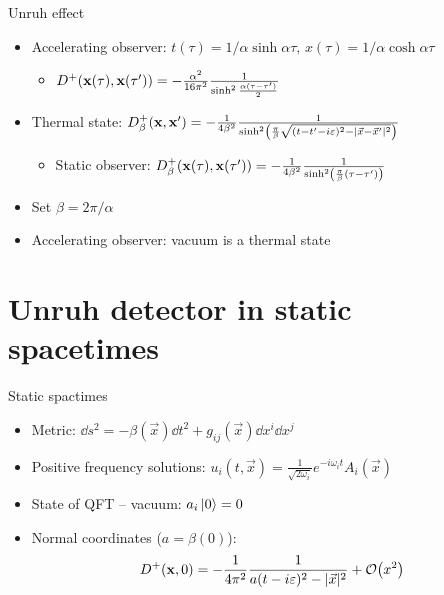 \documentclass{beamer}
\renewcommand{\va}[1]{\vec{#1}}
\begin{document}
\begin{frame}{Unruh effect}
\begin{itemize}
	\item Accelerating observer: \(t(\tau) = 1/\alpha \sinh \alpha\tau,\,x(\tau) = 1/\alpha \cosh \alpha\tau\)
	\begin{itemize}
		\item \(D^+(\vb{x}(\tau), \vb{x}(\tau')) = -\frac{\alpha^2}{16\pi^2} \frac{1}{\sinh^2\frac{\alpha(\tau-\tau')}{2}}\)
	\end{itemize}
	\item Thermal state: \(D^+_\beta(\vb{x},\vb{x}') = -\frac{1}{4\beta^2} \frac{1}{\sinh[2](\frac{\pi}{\beta}\sqrt{(t-t'-i\varepsilon)^2 - |\va{x}-\va{x}'|^2})}\)
	\begin{itemize}
		\item Static observer: \(D^+_\beta(\vb{x}(\tau),\vb{x}(\tau')) = -\frac{1}{4\beta^2} \frac{1}{\sinh[2](\frac{\pi}{\beta} (\tau-\tau'))}\)
	\end{itemize}
	\item Set \(\beta = 2\pi/\alpha\)
	\item Accelerating observer: vacuum is a thermal state
\end{itemize}
\end{frame}

\section{Unruh detector in static spacetimes}
\begin{frame}{Static spactimes}
\begin{itemize}
	\item Metric: \(\dd{s^2} = -\beta(\va{x}) \dd{t^2} + g_{ij}(\va{x}) \dd{x^i} \dd{x^j}\)
	\item Positive frequency solutions: \(u_{i}(t, \va{x}) = \frac{1}{\sqrt{2\omega_i}}e^{-i\omega_i t} A_i(\va{x})\)
	\item State of QFT -- vacuum: \(a_i \ket*{0} = 0\)
	\item Normal coordinates (\(a = \beta(0)\)): \[D^+(\vb{x},0) = -\frac{1}{4\pi^2} \frac{1}{a(t-i\varepsilon)^2 - |\va{x}|^2} + \order{x^2}\]
\end{itemize}
\end{frame}
\end{document}
